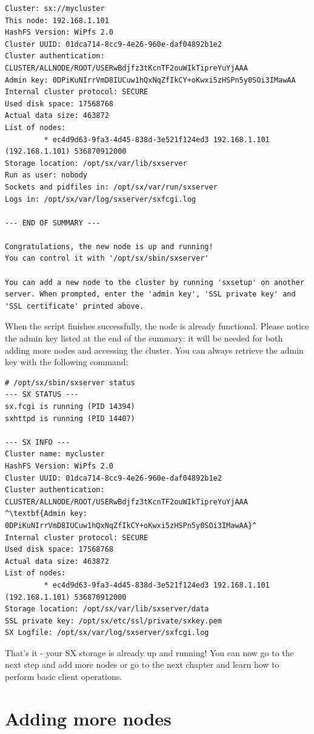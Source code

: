 \begin{lstlisting}
Cluster: sx://mycluster
This node: 192.168.1.101
HashFS Version: WiPfs 2.0
Cluster UUID: 01dca714-8cc9-4e26-960e-daf04892b1e2
Cluster authentication:
CLUSTER/ALLNODE/ROOT/USERwBdjfz3tKcnTF2ouWIkTipreYuYjAAA
Admin key: 0DPiKuNIrrVmD8IUCuw1hQxNqZfIkCY+oKwxi5zHSPn5y0SOi3IMawAA
Internal cluster protocol: SECURE
Used disk space: 17568768
Actual data size: 463872
List of nodes:
         * ec4d9d63-9fa3-4d45-838d-3e521f124ed3 192.168.1.101 (192.168.1.101) 536870912000
Storage location: /opt/sx/var/lib/sxserver
Run as user: nobody
Sockets and pidfiles in: /opt/sx/var/run/sxserver
Logs in: /opt/sx/var/log/sxserver/sxfcgi.log

--- END OF SUMMARY ---

Congratulations, the new node is up and running!
You can control it with '/opt/sx/sbin/sxserver'

You can add a new node to the cluster by running 'sxsetup' on another
server. When prompted, enter the 'admin key', 'SSL private key' and
'SSL certificate' printed above.
\end{lstlisting}
\LARGE
When the script finishes successfully, the node is already functional.
Please notice the admin key listed at the end of the summary: it will be
needed for both adding more nodes and accessing the cluster. You can
always retrieve the admin key with the following command:
\small
\begin{lstlisting}
# /opt/sx/sbin/sxserver status
--- SX STATUS ---
sx.fcgi is running (PID 14394)
sxhttpd is running (PID 14407)

--- SX INFO ---
Cluster name: mycluster
HashFS Version: WiPfs 2.0
Cluster UUID: 01dca714-8cc9-4e26-960e-daf04892b1e2
Cluster authentication: CLUSTER/ALLNODE/ROOT/USERwBdjfz3tKcnTF2ouWIkTipreYuYjAAA
^\textbf{Admin key: 0DPiKuNIrrVmD8IUCuw1hQxNqZfIkCY+oKwxi5zHSPn5y0SOi3IMawAA}^
Internal cluster protocol: SECURE
Used disk space: 17568768
Actual data size: 463872
List of nodes:
         * ec4d9d63-9fa3-4d45-838d-3e521f124ed3 192.168.1.101 (192.168.1.101) 536870912000
Storage location: /opt/sx/var/lib/sxserver/data
SSL private key: /opt/sx/etc/ssl/private/sxkey.pem
SX Logfile: /opt/sx/var/log/sxserver/sxfcgi.log
\end{lstlisting}
\LARGE
That's it - your SX storage is already up and running! You can now
go to the next step and add more nodes or go to the next chapter and
learn how to perform basic client operations.

\section*{Adding more nodes}

